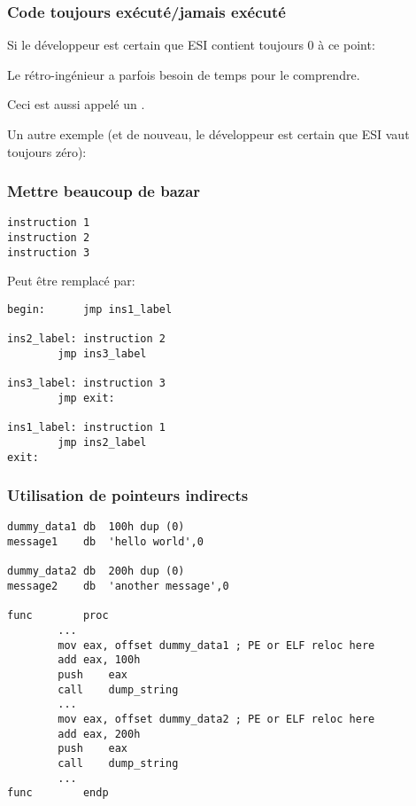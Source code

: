 \subsubsection{Code toujours exécuté/jamais exécuté}

Si le développeur est certain que ESI contient toujours 0 à ce point:



Le rétro-ingénieur a parfois besoin de temps pour le comprendre.

Ceci est aussi appelé un .

Un autre exemple (et de nouveau, le développeur est certain que ESI vaut toujours
zéro):



\subsubsection{Mettre beaucoup de bazar}

\begin{lstlisting}
instruction 1
instruction 2
instruction 3
\end{lstlisting}

Peut être remplacé par:

\begin{lstlisting}[style=customasmx86]
begin:		jmp	ins1_label

ins2_label:	instruction 2
		jmp	ins3_label

ins3_label:	instruction 3
		jmp	exit:

ins1_label:	instruction 1
		jmp	ins2_label
exit:
\end{lstlisting}

\subsubsection{Utilisation de pointeurs indirects}

\begin{lstlisting}[style=customasmx86]
dummy_data1	db	100h dup (0)
message1	db	'hello world',0

dummy_data2	db	200h dup (0)
message2	db	'another message',0

func		proc
		...
		mov	eax, offset dummy_data1 ; PE or ELF reloc here
		add	eax, 100h
		push	eax
		call	dump_string
		...
		mov	eax, offset dummy_data2 ; PE or ELF reloc here
		add	eax, 200h
		push	eax
		call	dump_string
		...
func		endp
\end{lstlisting}

